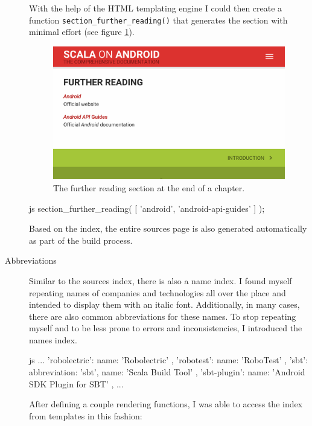 \begin{description}
	With the help of the \ac{HTML} templating engine I could then create a function \texttt{section\_further\_reading()} that generates the section with minimal effort (see figure \ref{further-reading}).

	\begin{figure}[]
		\includegraphics[width=\textwidth]{asset/further-reading.png}
		\caption{The further reading section at the end of a chapter.}
		\label{further-reading}
	\end{figure}

	\begin{code}{js}
section_further_reading( [ 'android', 'android-api-guides' ] );
	\end{code}

	Based on the index, the entire sources page is also generated automatically as part of the build process.

	\item[Abbreviations]\hfill

	Similar to the sources index, there is also a name index. I found myself repeating names of companies and technologies all over the place and intended to display them with an italic font. Additionally, in many cases, there are also common abbreviations for these names. To stop repeating myself and to be less prone to errors and inconsistencies, I introduced the names index.

	\begin{code}{js}
...
'robolectric': { name: 'Robolectric' },
'robotest': { name: 'RoboTest' },
'sbt':
{
	abbreviation: 'sbt',
	name: 'Scala Build Tool'
},
'sbt-plugin': { name: 'Android SDK Plugin for SBT' },
...
	\end{code}

	After defining a couple rendering functions, I was able to access the index from templates in this fashion:


\end{description}
